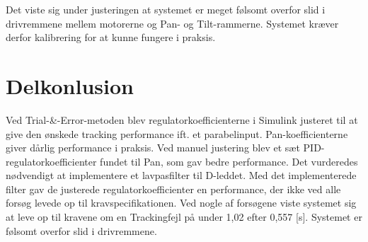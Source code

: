 
%
%

Det viste sig under justeringen at systemet er meget følsomt overfor slid i drivremmene mellem motorerne og Pan- og Tilt-rammerne.
Systemet kræver derfor kalibrering for at kunne fungere i praksis.

\section{Delkonlusion}
Ved Trial-\&-Error-metoden blev regulatorkoefficienterne i Simulink justeret til at give den ønskede 
tracking performance ift. et parabelinput. Pan-koefficienterne giver dårlig performance i praksis.
Ved manuel justering blev et sæt PID-regulatorkoefficienter fundet til Pan, som gav bedre performance.
Det vurderedes nødvendigt at implementere et lavpasfilter til D-leddet.
Med det implementerede filter gav de justerede regulatorkoefficienter en performance,
der ikke ved alle forsøg levede op til kravspecifikationen. Ved nogle af forsøgene viste
systemet sig at leve op til kravene om en Trackingfejl på under 1,02 \degree{} efter 0,557 [s].
Systemet er følsomt overfor slid i drivremmene.